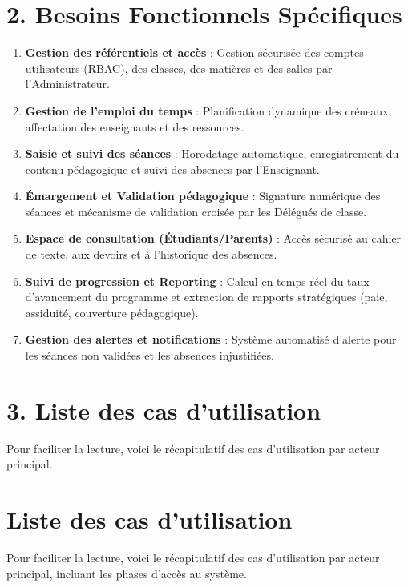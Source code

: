 \documentclass[a4paper, 11pt]{article}
\begin{document}
\section*{2. Besoins Fonctionnels Spécifiques}
\begin{enumerate}
    \item \textbf{Gestion des référentiels et accès} : Gestion sécurisée des comptes utilisateurs (RBAC), des classes, des matières et des salles par l'Administrateur.
    \item \textbf{Gestion de l'emploi du temps} : Planification dynamique des créneaux, affectation des enseignants et des ressources.
    \item \textbf{Saisie et suivi des séances} : Horodatage automatique, enregistrement du contenu pédagogique et suivi des absences par l'Enseignant.
    \item \textbf{Émargement et Validation pédagogique} : Signature numérique des séances et mécanisme de validation croisée par les Délégués de classe.
    \item \textbf{Espace de consultation (Étudiants/Parents)} : Accès sécurisé au cahier de texte, aux devoirs et à l'historique des absences.
    \item \textbf{Suivi de progression et Reporting} : Calcul en temps réel du taux d'avancement du programme et extraction de rapports stratégiques (paie, assiduité, couverture pédagogique).
    \item \textbf{Gestion des alertes et notifications} : Système automatisé d'alerte pour les séances non validées et les absences injustifiées.
\end{enumerate}

\section*{3. Liste des cas d'utilisation}
Pour faciliter la lecture, voici le récapitulatif des cas d'utilisation par acteur principal. 

\vspace{0.5cm}

\section{Liste des cas d'utilisation}
Pour faciliter la lecture, voici le récapitulatif des cas d'utilisation par acteur principal, incluant les phases d'accès au système.
\end{document}
